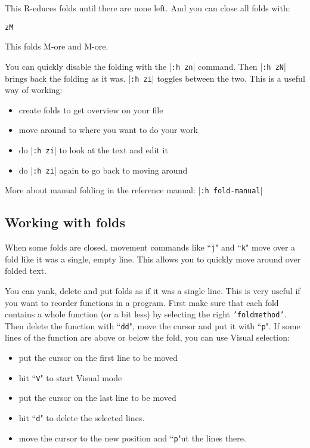 This R-educes folds until there are none left.
And you can close all folds with:

\begin{Verbatim}[samepage=true]
 zM
\end{Verbatim}

This folds M-ore and M-ore.

You can quickly disable the folding with the |\texttt{:h zn}| command.
Then |\texttt{:h zN}| brings back the folding as it was.
|\texttt{:h zi}| toggles between the two.
This is a useful way of working:

\begin{itemize}
\item create folds to get overview on your file
\item move around to where you want to do your work
\item do |\texttt{:h zi}| to look at the text and edit it
\item do |\texttt{:h zi}| again to go back to moving around
\end{itemize}

More about manual folding in the reference manual: |\texttt{:h fold-manual}|
\subsection{Working with folds}
When some folds are closed, movement commands like ``\texttt{j}" and ``\texttt{k}" move over a fold like it was a single, empty line.
This allows you to quickly move around over folded text.

You can yank, delete and put folds as if it was a single line.
This is very useful if you want to reorder functions in a program.
First make sure that each fold contains a whole function (or a bit less) by selecting the right \texttt{'foldmethod'}.
Then delete the function with ``\texttt{dd}", move the cursor and put it with ``\texttt{p}".
If some lines of the function are above or below the fold, you can use Visual selection:

\begin{itemize}
\item put the cursor on the first line to be moved
\item hit ``\texttt{V}" to start Visual mode
\item put the cursor on the last line to be moved
\item hit ``\texttt{d}" to delete the selected lines.
\item move the cursor to the new position and ``\texttt{p}"ut the lines there.
\end{itemize}


